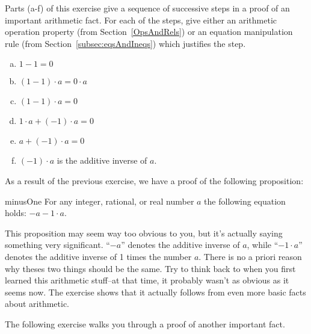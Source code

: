 \begin{exercise}{}
Parts (a-f) of this exercise give a sequence of successive steps in a proof of an important arithmetic fact. For each of the steps, give either an arithmetic operation property (from Section~\ref{OpsAndRels}) or an equation manipulation rule (from Section~\ref{subsec:eqsAndIneqs}) which justifies the step.
\begin{enumerate}[(a)]
\item
$1 -1 = 0$
\item
$(1-1)\cdot a = 0 \cdot a$
\item
$(1-1)\cdot a = 0$
\item
$1 \cdot a + (-1) \cdot a = 0$
\item
$a + (-1) \cdot a = 0$
\item
$(-1) \cdot a$ is the additive inverse of $a$.
\end{enumerate}
\end{exercise}

As a result of the previous exercise, we have a proof of the following proposition:

\begin{prop}{minusOne}
For any integer, rational, or real number $a$ the following equation holds: $ -a -1 \cdot a $. 
\end{prop}
This proposition may seem way too obvious to you, but it's actually saying something very significant. ``$-a$'' denotes the additive inverse of $a$, while ``$-1 \cdot a$'' denotes the additive inverse of 1 times the number $a$. There is no a priori reason why theses two things should be the same. Try to think back to when you first learned this arithmetic stuff--at that time, it probably wasn't as obvious as it seems now. The exercise shows that it actually follows from even more basic facts about arithmetic.


The following exercise walks you through a proof of another important fact.

